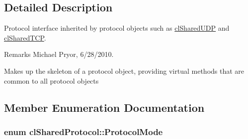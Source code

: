 \subsection{Detailed Description}
Protocol interface inherited by protocol objects such as \hyperlink{classcl_shared_u_d_p}{clSharedUDP} and \hyperlink{classcl_shared_t_c_p}{clSharedTCP}. \begin{DoxyRemark}{Remarks}
Michael Pryor, 6/28/2010.
\end{DoxyRemark}
Makes up the skeleton of a protocol object, providing virtual methods that are common to all protocol objects 

\subsection{Member Enumeration Documentation}
\hypertarget{classcl_shared_protocol_a4b0b9c82b8ae4eee78c6308c35afd47b}{
\subsubsection[{ProtocolMode}]{\setlength{\rightskip}{0pt plus 5cm}enum {\bf clSharedProtocol::ProtocolMode}}}
\label{classcl_shared_protocol_a4b0b9c82b8ae4eee78c6308c35afd47b}
